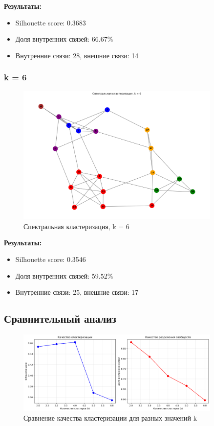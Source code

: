 \textbf{Результаты:}
\begin{itemize}
    \item Silhouette score: 0.3683
    \item Доля внутренних связей: 66.67\%
    \item Внутренние связи: 28, внешние связи: 14
\end{itemize}

\subsubsection*{k = 6}

\begin{figure}[H]
    \centering
    \includegraphics[width=0.9\textwidth]{images/task1/clustering_k6.png}
    \caption{Спектральная кластеризация, k = 6}
\end{figure}

\textbf{Результаты:}
\begin{itemize}
    \item Silhouette score: 0.3546
    \item Доля внутренних связей: 59.52\%
    \item Внутренние связи: 25, внешние связи: 17
\end{itemize}

\subsection*{Сравнительный анализ}

\begin{figure}[H]
    \centering
    \includegraphics[width=0.9\textwidth]{images/task1/clustering_comparison.png}
    \caption{Сравнение качества кластеризации для разных значений k}
\end{figure}

